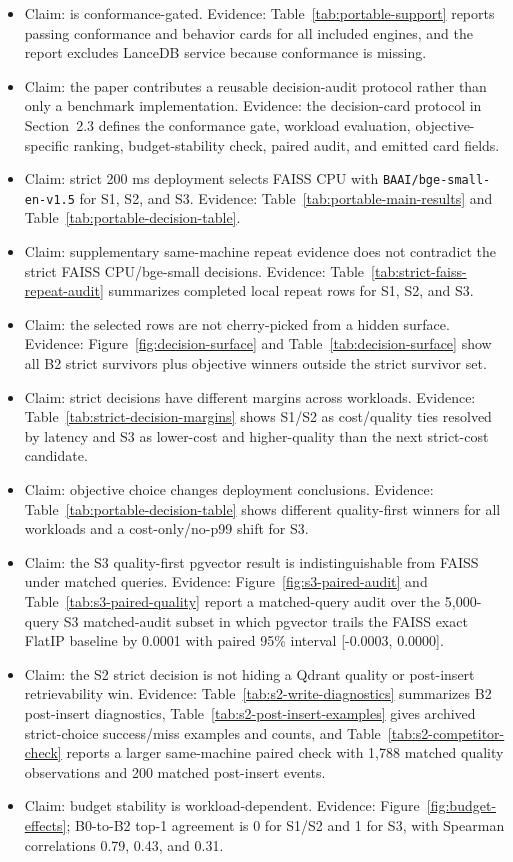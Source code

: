 \begin{itemize}[leftmargin=*]
  \item Claim: \sys is conformance-gated. Evidence: Table~\ref{tab:portable-support} reports passing conformance and behavior cards for all included engines, and the report excludes LanceDB service because conformance is missing.
  \item Claim: the paper contributes a reusable decision-audit protocol rather than only a benchmark implementation. Evidence: the decision-card protocol in Section~2.3 defines the conformance gate, workload evaluation, objective-specific ranking, budget-stability check, paired audit, and emitted card fields.
  \item Claim: strict 200 ms \maxrowp{} deployment selects FAISS CPU with \texttt{BAAI/bge-small-en-v1.5} for S1, S2, and S3. Evidence: Table~\ref{tab:portable-main-results} and Table~\ref{tab:portable-decision-table}.
  \item Claim: supplementary same-machine repeat evidence does not contradict the strict FAISS CPU/bge-small decisions. Evidence: Table~\ref{tab:strict-faiss-repeat-audit} summarizes completed local repeat rows for S1, S2, and S3.
  \item Claim: the selected rows are not cherry-picked from a hidden surface. Evidence: Figure~\ref{fig:decision-surface} and Table~\ref{tab:decision-surface} show all B2 strict survivors plus objective winners outside the strict survivor set.
  \item Claim: strict decisions have different margins across workloads. Evidence: Table~\ref{tab:strict-decision-margins} shows S1/S2 as cost/quality ties resolved by latency and S3 as lower-cost and higher-quality than the next strict-cost candidate.
  \item Claim: objective choice changes deployment conclusions. Evidence: Table~\ref{tab:portable-decision-table} shows different quality-first winners for all workloads and a cost-only/no-p99 shift for S3.
  \item Claim: the S3 quality-first pgvector result is indistinguishable from FAISS under matched queries. Evidence: Figure~\ref{fig:s3-paired-audit} and Table~\ref{tab:s3-paired-quality} report a matched-query audit over the 5{,}000-query S3 matched-audit subset in which pgvector trails the FAISS exact FlatIP baseline by 0.0001 \ecov{} with paired 95\% interval [-0.0003, 0.0000].
  \item Claim: the S2 strict decision is not hiding a Qdrant quality or post-insert retrievability win. Evidence: Table~\ref{tab:s2-write-diagnostics} summarizes B2 post-insert diagnostics, Table~\ref{tab:s2-post-insert-examples} gives archived strict-choice success/miss examples and counts, and Table~\ref{tab:s2-competitor-check} reports a larger same-machine paired check with 1{,}788 matched quality observations and 200 matched post-insert events.
  \item Claim: budget stability is workload-dependent. Evidence: Figure~\ref{fig:budget-effects}; B0-to-B2 top-1 agreement is 0 for S1/S2 and 1 for S3, with Spearman correlations 0.79, 0.43, and 0.31.
\end{itemize}

\FloatBarrier
